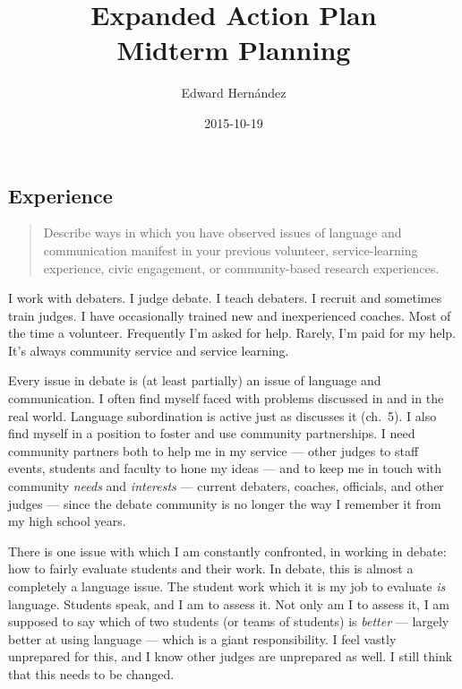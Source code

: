 \documentclass[doc,12pt]{apa6}
\begin{document}
\title{Expanded Action Plan \\ Midterm Planning}
\author{Edward Hern\'{a}ndez}
\date{2015-10-19}
\maketitle


\subsection{Experience}\label{experience}

\begin{quote}
Describe ways in which you have observed issues of language and
communication manifest in your previous volunteer, service-learning
experience, civic engagement, or community-based research experiences.
\end{quote}

I work with debaters. I judge debate. I teach debaters. I recruit and
sometimes train judges. I have occasionally trained new and
inexperienced coaches. Most of the time a volunteer. Frequently I'm
asked for help. Rarely, I'm paid for my help. It's always community
service and service learning.

Every issue in debate is (at least partially) an issue of language and
communication. I often find myself faced with problems discussed in
 and  in the real world. Language
subordination is active just as  discusses it
(ch.~5). I also find myself in a position to foster and use
community partnerships. I need community partners both to help me in my
service --- other judges to staff events, students and faculty to hone
my ideas --- and to keep me in touch with community \emph{needs} and \emph{interests} \cite[ch.~2]{Cress13} --- current debaters, coaches,
officials, and other judges --- since the debate community is no longer
the way I remember it from my high school years.

There is one issue with which I am constantly confronted, in working in
debate: how to fairly evaluate students and their work. In debate, this
is almost a completely a language issue. The student work which it is my
job to evaluate \emph{is} language. Students speak, and I am to assess
it. Not only am I to assess it, I am supposed to say which of two
students (or teams of students) is \emph{better} --- largely better at
using language --- which is a giant responsibility. I feel vastly
unprepared for this, and I know other judges are unprepared as well. I
still think that this needs to be changed.
\end{document}
